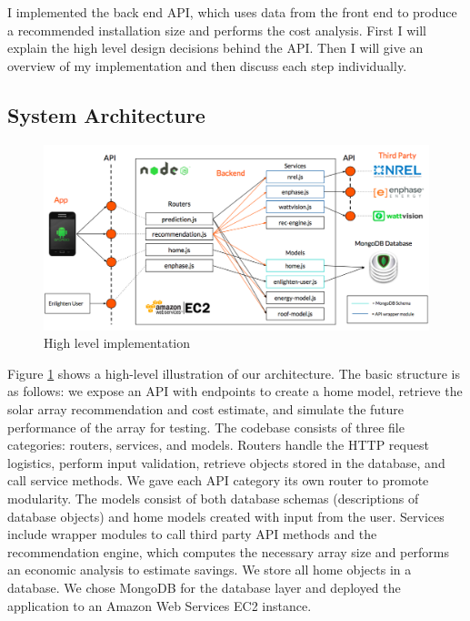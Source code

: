 \documentclass[pageno]{jpaper}
\begin{document}
I implemented the back end API, which uses data from the front end to produce a recommended installation size and performs the cost analysis. First I will explain the high level design decisions behind the API. Then I will give an overview of my implementation and then discuss each step individually. 

\subsection{System Architecture}

\begin{figure}[h]
\begin{center}
\includegraphics[width=\textwidth] {architecture}
\caption{High level implementation}
\label{fig:architecture}
\end{center}
\end{figure}

Figure \ref{fig:architecture} shows a high-level illustration of our architecture. The basic structure is as follows: we expose an API with endpoints to create a home model, retrieve the solar array recommendation and cost estimate, and simulate the future performance of the array for testing. The codebase consists of three file categories: routers, services, and models. Routers handle the HTTP request logistics, perform input validation, retrieve objects stored in the database, and call service methods. We gave each API category its own router to promote modularity. The models consist of both database schemas (descriptions of database objects) and home models created with input from the user. Services include wrapper modules to call third party API methods and the recommendation engine, which computes the necessary array size and performs an economic analysis to estimate savings. We store all home objects in a database. We chose MongoDB for the database layer and deployed the application to an Amazon Web Services EC2 instance.
\end{document}
